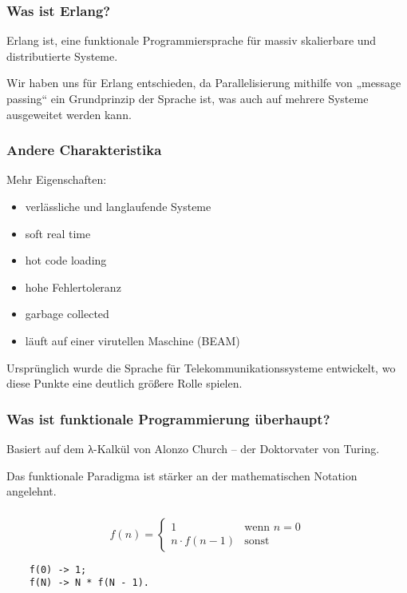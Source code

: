 \documentclass[compress]{beamer}
\begin{document}
\begin{frame}
  \frametitle{Was ist Erlang?}

  Erlang ist, eine funktionale Programmiersprache für massiv
  skalierbare und distributierte Systeme.

  Wir haben uns für Erlang entschieden, da Parallelisierung mithilfe
  von „message passing“ ein Grundprinzip der Sprache ist, was auch auf
  mehrere Systeme ausgeweitet werden kann.
\end{frame}

\begin{frame}
  \frametitle{Andere Charakteristika}

  Mehr Eigenschaften:

  \begin{itemize}
  \item verlässliche und langlaufende Systeme
  \item soft real time
  \item hot code loading
  \item hohe Fehlertoleranz
  \item garbage collected
  \item läuft auf einer virutellen Maschine (BEAM)
  \end{itemize}

  Ursprünglich wurde die Sprache für Telekommunikationssysteme
  entwickelt, wo diese Punkte eine deutlich größere Rolle spielen.
\end{frame}

\begin{frame}
  \frametitle{Was ist funktionale Programmierung überhaupt?}

  Basiert auf dem λ-Kalkül von Alonzo Church – der Doktorvater von
  Turing.

  Das funktionale Paradigma ist stärker an der mathematischen Notation
  angelehnt.
\end{frame}

\begin{frame}[fragile]
  \frametitle{}
  $$
  f(n) =
  \begin{cases}
    1             &\textrm{wenn } n = 0 \\
    n \cdot f(n - 1) & \textrm{sonst}
  \end{cases}
  $$
  \vfill

  \begin{lstlisting}
    f(0) -> 1;
    f(N) -> N * f(N - 1).
  \end{lstlisting}
\end{frame}
\end{document}
